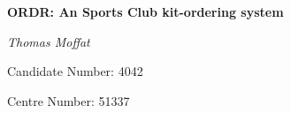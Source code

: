 \documentclass[
11pt, %
a4paper, %
oneside, %
headinclude,footinclude, %
BCOR5mm, %
]{scrartcl}
\begin{document}

\renewcommand{\sectionmark}[1]{\markright{\spacedlowsmallcaps{#1}}} %
\lehead{\mbox{\llap{\small\thepage\kern1em\color{halfgray} \vline}\color{halfgray}\hspace{0.5em}\rightmark\hfil}} %

\pagestyle{scrheadings} %


\begin{titlepage}
	\vspace{5cm}
	\centering
	{\huge\bfseries ORDR: An Sports Club kit-ordering system\par}
	\vspace{2cm}
	{\Large\itshape Thomas Moffat\par}
	\vspace{1cm}
	{Candidate Number: 4042\par}
	\vspace{1cm}
	{Centre Number: 51337}
	\vfill
\end{titlepage}

\setcounter{tocdepth}{2} %

\tableofcontents %

\listoffigures

\listoftables



\end{document}
